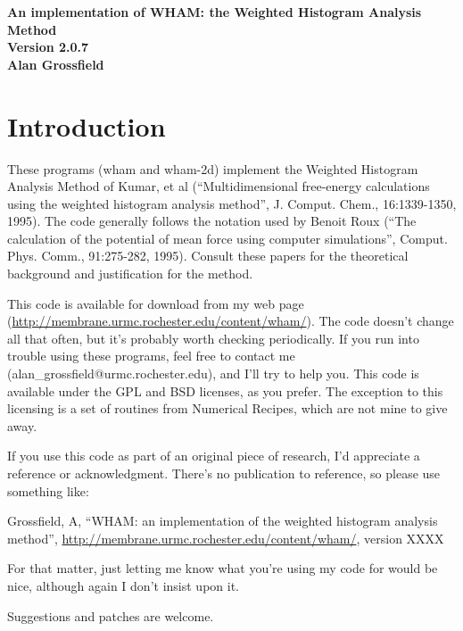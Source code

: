 \documentclass[12pt]{article}
\begin{document}
\begin{center}
\begin{LARGE}
{\bf An implementation of WHAM: the Weighted Histogram Analysis Method} \\
{\bf Version 2.0.7} \\
\vspace*{0.5in}
{\bf Alan Grossfield} \\
\end{LARGE}
\end{center}

\tableofcontents

\newpage

\section{Introduction}

These programs (wham and wham-2d) implement the Weighted Histogram
Analysis Method of Kumar, et al (``Multidimensional free-energy
calculations using the weighted histogram analysis method'',
J. Comput. Chem., 16:1339-1350, 1995).  The code generally
follows the notation used by Benoit Roux (``The calculation of the
potential of mean force using computer simulations'', Comput. Phys. Comm.,
91:275-282, 1995).  Consult these papers for the theoretical background
and justification for the method.

This code is available for download from my web page
(\url{http://membrane.urmc.rochester.edu/content/wham/}). The code doesn't
change all that often, but it's probably worth checking periodically.  If you
run into trouble using these programs, feel free to contact me
(alan\_grossfield@urmc.rochester.edu), and I'll try to help you.  This code
is available under the GPL and BSD licenses, as you prefer.  The exception to
this licensing is a set of routines from Numerical Recipes, which are not mine
to give away.  

If you use this code as part of an original piece of research, I'd
appreciate a reference or acknowledgment.  There's no publication to
reference, so please use something like:

\noindent
Grossfield, A, ``WHAM: an implementation of the weighted histogram analysis 
method'', \url{http://membrane.urmc.rochester.edu/content/wham/}, version
XXXX

\noindent For that matter, just letting me know what you're using my code for
would be nice, although again I don't insist upon it.

Suggestions and patches are welcome.  
\end{document}
